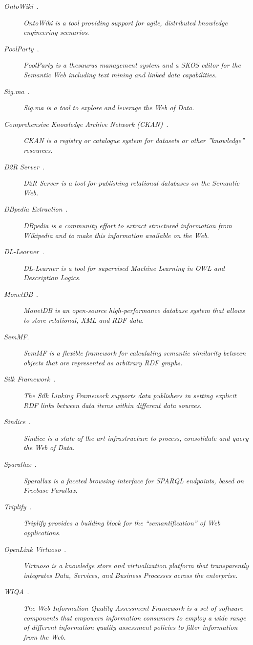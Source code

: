 \begin{description}
 \item [\textit{OntoWiki}~\cite{tramp-s-2010-ekaw-demo}.] \textit{OntoWiki is a tool providing support for agile, distributed knowledge engineering scenarios}. 
 \item [\textit{PoolParty}~\cite{poolparty}.] \textit{PoolParty is a thesaurus management system and a SKOS editor for the Semantic Web including text mining and linked data capabilities.}
 \item [\textit{Sig.ma}~\cite{citeulike:8529753}.] \textit{Sig.ma is a tool to explore and leverage the Web of Data.}
 \item [\textit{Comprehensive Knowledge Archive Network (CKAN)~\cite{ckan}}.] \textit{CKAN is a registry or catalogue system for datasets or other ''knowledge'' resources.}
 \item [\textit{D2R Server}~\cite{Bizer_Cyganiak_2006}.] \textit{D2R Server is a tool for publishing relational databases on the Semantic Web. }
 \item [\textit{DBpedia Extraction}~\cite{Bizer:2009:D-C:1640541.1640848}.] \textit{DBpedia is a community effort to extract structured information from Wikipedia and to make this information available on the Web.}
 \item [\textit{DL-Learner}~\cite{lehmann2009}.] \textit{DL-Learner is a tool for supervised Machine Learning in OWL and Description Logics.}
 \item [\textit{MonetDB}~\cite{Boncz06monetdb/xquery:a}.] \textit{MonetDB is an open-source high-performance database system that allows to store relational, XML and RDF data}.
 \item [\textit{SemMF}.] \textit{SemMF is a flexible framework for calculating semantic similarity between objects that are represented as arbitrary RDF graphs.}
 \item [\textit{Silk Framework}~\cite{www2009227}.] \textit{The Silk Linking Framework supports data publishers in setting explicit RDF links between data items within different data sources.}
 \item [\textit{Sindice}~\cite{TummarelloDO07}.] \textit{Sindice is a state of the art infrastructure to process, consolidate and query the Web of Data. }
 \item [\textit{Sparallax}~\cite{Sparallax}.] \textit{Sparallax is a faceted browsing interface for SPARQL endpoints, based on Freebase Parallax.}
 \item [\textit{Triplify}~\cite{Triplify}.] \textit{Triplify provides a building block for the ``semantification'' of Web applications.}
 \item [\textit{OpenLink Virtuoso}~\cite{Virtuoso}.] \textit{Virtuoso is a knowledge store and virtualization platform that transparently integrates Data, Services, and Business Processes across the enterprise.}
 \item [\textit{WIQA}~\cite{wiqa}.] \textit{The Web Information Quality Assessment Framework is a set of software components that empowers information consumers to employ a wide range of different information quality assessment policies to filter information from the Web.} 
\end{description}

